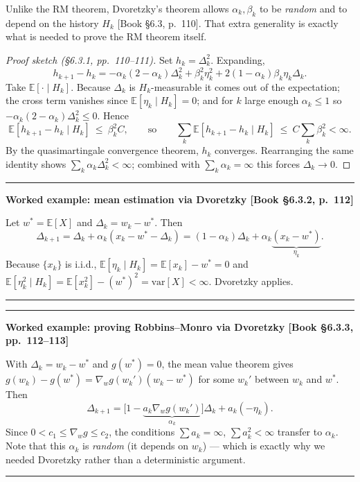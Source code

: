 \documentclass[11pt, letterpaper]{article}
\theoremstyle{runin}
\theoremstyle{runinplain}
\theoremstyle{remark}
\newcommand{\E}{\mathbb{E}}
\newcommand{\Var}{\mathrm{var}}
\newcommand{\bkin}[1]{{\color{bookblue}\small[\textsf{Book #1}]}}
\newenvironment{worked}[1]
  {\par\medskip\noindent\rule{\textwidth}{0.4pt}\par\nobreak\vspace{0.3em}
   \noindent\textbf{Worked example: #1}\par\nobreak\vspace{0.2em}\small}
  {\par\nobreak\vspace{0.3em}\noindent\rule{\textwidth}{0.4pt}\par\medskip}
\begin{document}
Unlike the RM theorem, Dvoretzky's theorem allows $\alpha_k,\beta_k$ to be
\emph{random} and to depend on the history $H_k$ \bkin{\S6.3, p.~110}. That extra
generality is exactly what is needed to prove the RM theorem itself.

\begin{proof}[Proof sketch (\S6.3.1, pp.~110--111)]
Set $h_k=\Delta_k^2$. Expanding,
\[
  h_{k+1}-h_k=-\alpha_k(2-\alpha_k)\Delta_k^2+\beta_k^2\eta_k^2+2(1-\alpha_k)\beta_k\eta_k\Delta_k .
\]
Take $\E[\cdot\mid H_k]$. Because $\Delta_k$ is $H_k$-measurable it comes out of the
expectation; the cross term vanishes since $\E[\eta_k\mid H_k]=0$; and for $k$ large
enough $\alpha_k\le1$ so $-\alpha_k(2-\alpha_k)\Delta_k^2\le0$. Hence
\[
  \E[h_{k+1}-h_k\mid H_k]\ \le\ \beta_k^2C,
  \qquad\text{so}\qquad
  \sum_k\E[h_{k+1}-h_k\mid H_k]\ \le\ C\sum_k\beta_k^2<\infty .
\]
By the quasimartingale convergence theorem, $h_k$ converges. Rearranging the same
identity shows $\sum_k\alpha_k\Delta_k^2<\infty$; combined with
$\sum_k\alpha_k=\infty$ this forces $\Delta_k\to0$.
\end{proof}

\begin{worked}{mean estimation via Dvoretzky \bkin{\S6.3.2, p.~112}}
Let $w^*=\E[X]$ and $\Delta_k=w_k-w^*$. Then
\[
  \Delta_{k+1}=\Delta_k+\alpha_k(x_k-w^*-\Delta_k)
             =(1-\alpha_k)\Delta_k+\alpha_k\underbrace{(x_k-w^*)}_{\eta_k}.
\]
Because $\{x_k\}$ is i.i.d., $\E[\eta_k\mid H_k]=\E[x_k]-w^*=0$ and
$\E[\eta_k^2\mid H_k]=\E[x_k^2]-(w^*)^2=\Var[X]<\infty$. Dvoretzky applies.
\end{worked}

\begin{worked}{proving Robbins--Monro via Dvoretzky \bkin{\S6.3.3, pp.~112--113}}
With $\Delta_k=w_k-w^*$ and $g(w^*)=0$, the mean value theorem gives
$g(w_k)-g(w^*)=\nabla_wg(w_k')(w_k-w^*)$ for some $w_k'$ between $w_k$ and $w^*$.
Then
\[
  \Delta_{k+1}=\bigl[1-\underbrace{a_k\nabla_wg(w_k')}_{\alpha_k}\bigr]\Delta_k+a_k(-\eta_k).
\]
Since $0<c_1\le\nabla_wg\le c_2$, the conditions
$\sum a_k=\infty$, $\sum a_k^2<\infty$ transfer to $\alpha_k$. Note that this
$\alpha_k$ is \emph{random} (it depends on $w_k$) --- which is exactly why we needed
Dvoretzky rather than a deterministic argument.
\end{worked}
\end{document}
